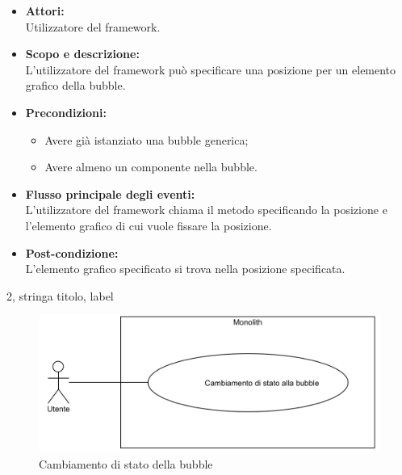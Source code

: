 \begin{itemize}
	\item \textbf{Attori:}
	\\Utilizzatore del framework.
	\item \textbf{Scopo e descrizione:} 
	\\L'utilizzatore del framework può specificare una posizione per un elemento grafico della bubble.
	\item \textbf{Precondizioni:}
	\begin{itemize}
		\item Avere già istanziato una bubble generica;
		\item Avere almeno un componente nella bubble.
	\end{itemize}
	\item \textbf{Flusso principale degli eventi:}
	\\L'utilizzatore del framework chiama il metodo specificando la posizione e l'elemento grafico di cui vuole fissare la posizione.
	\item \textbf{Post-condizione:}
	\\L'elemento grafico specificato si trova nella posizione specificata.
\end{itemize}

{2, stringa titolo, label}

\isfirsttrue
{}

\begin{figure}[H]
	\centering
	\includegraphics[width=15cm]{../../documenti/AnalisiDeiRequisiti/Diagrammi_img/uc1_06.png}
	\caption{\UCCCaption{} Cambiamento di stato della bubble}
\end{figure}

